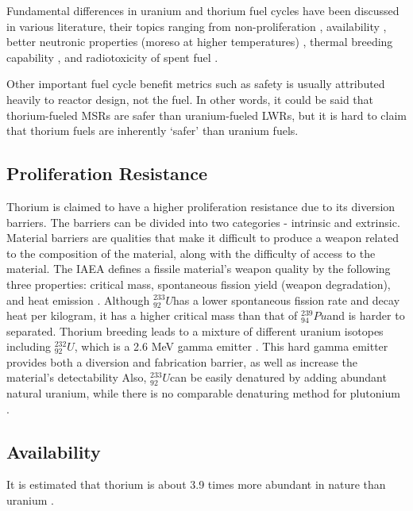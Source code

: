 \documentclass{article}
\newcommand{\uthree}{$^{233}_{92}U$}
\newcommand{\utwo}{$^{232}_{92}U$}
\newcommand{\pu}{$^{239}_{94}Pu$}
\begin{document}
Fundamental differences in uranium and thorium fuel
cycles have been discussed in various literature,
their topics ranging from 
non-proliferation
\cite{iaea_thorium_2005} 
\cite{moir_recommendations_2008} 
\cite{kang_u-232_2001} %
,
availability
\cite{herring_uranium_2013}
,
better neutronic properties (moreso at higher temperatures)
\cite{lung_perspectives_1998}
,
thermal breeding capability
\cite{robertson_conceptual_1971}
,
and 
radiotoxicity of spent fuel
\cite{croff_comparative_2016}
.

Other important fuel cycle benefit metrics
such as safety is usually attributed heavily
to reactor design, not the fuel. In other words,
it could be said that thorium-fueled \glspl{MSR} are safer
than uranium-fueled \glspl{LWR}, but it is hard to claim
that thorium fuels are inherently `safer' than uranium fuels.


\subsection{Proliferation Resistance}
Thorium is claimed to have a higher proliferation resistance
due to its diversion barriers. The barriers can be divided into
two categories - intrinsic and extrinsic. Material barriers
are qualities that make it difficult to produce a weapon related
to the composition of the material, along with the difficulty of
access to the material. The IAEA defines a fissile material's weapon
quality by the following three properties: critical mass, spontaneous 
fission yield (weapon degradation), and heat emission \cite{iaea_thorium_2005}.
Although \uthree has a lower spontaneous fission rate and decay heat per kilogram,
it has a higher critical mass than that of \pu and is harder to separated.
Thorium breeding leads to a mixture of different uranium isotopes including
\utwo, which is a 2.6 MeV gamma emitter \cite{moir_recommendations_2008}. This hard gamma emitter provides
both a diversion and fabrication barrier, as well as increase the material's detectability
Also, \uthree can be easily denatured by adding abundant natural uranium, while
there is no comparable denaturing method for plutonium \cite{kang_u-232_2001}.


\subsection{Availability}
It is estimated that thorium is about 3.9 times more abundant in
nature than uranium \cite{herring_uranium_2013}. 
\end{document}
